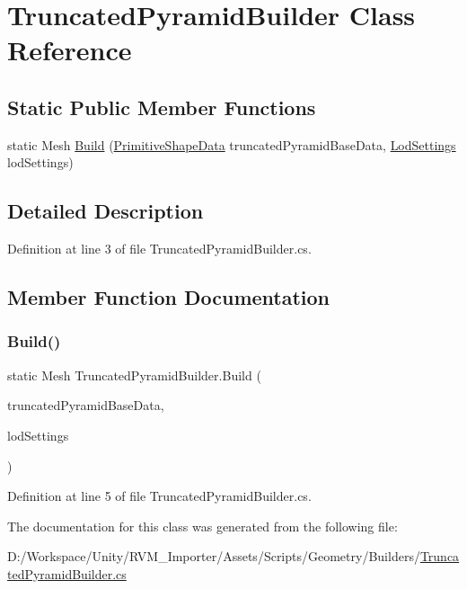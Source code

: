 \hypertarget{class_truncated_pyramid_builder}{}\section{Truncated\+Pyramid\+Builder Class Reference}
\label{class_truncated_pyramid_builder}
\subsection*{Static Public Member Functions}
\begin{DoxyCompactItemize}
\item 
static Mesh \mbox{\hyperlink{class_truncated_pyramid_builder_a82a5ce9bedb0bc90ea47169531c6623d}{Build}} (\mbox{\hyperlink{class_primitive_shape_data}{Primitive\+Shape\+Data}} truncated\+Pyramid\+Base\+Data, \mbox{\hyperlink{class_lod_settings}{Lod\+Settings}} lod\+Settings)
\end{DoxyCompactItemize}


\subsection{Detailed Description}


Definition at line 3 of file Truncated\+Pyramid\+Builder.\+cs.



\subsection{Member Function Documentation}
\mbox{\label{class_truncated_pyramid_builder_a82a5ce9bedb0bc90ea47169531c6623d}} 
\subsubsection{\texorpdfstring{Build()}{Build()}}
{\footnotesize\ttfamily static Mesh Truncated\+Pyramid\+Builder.\+Build (\begin{DoxyParamCaption}\item[{\mbox{\hyperlink{class_primitive_shape_data}{Primitive\+Shape\+Data}}}]{truncated\+Pyramid\+Base\+Data,  }\item[{\mbox{\hyperlink{class_lod_settings}{Lod\+Settings}}}]{lod\+Settings }\end{DoxyParamCaption})\hspace{0.3cm}{\ttfamily [static]}}



Definition at line 5 of file Truncated\+Pyramid\+Builder.\+cs.



The documentation for this class was generated from the following file\+:\begin{DoxyCompactItemize}
\item 
D\+:/\+Workspace/\+Unity/\+R\+V\+M\+\_\+\+Importer/\+Assets/\+Scripts/\+Geometry/\+Builders/\mbox{\hyperlink{_truncated_pyramid_builder_8cs}{Truncated\+Pyramid\+Builder.\+cs}}\end{DoxyCompactItemize}
